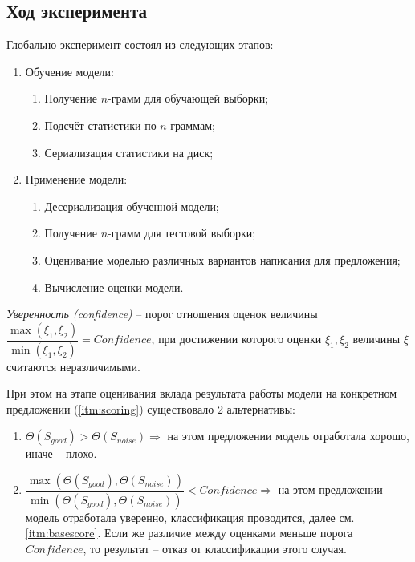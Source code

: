 \subsection{ Ход эксперимента }
\label{sec:confidencemodel}

Глобально эксперимент состоял из следующих этапов:

\begin{enumerate}
	\item Обучение модели:
	
	\begin{enumerate}
		\item Получение $n$-грамм для обучающей выборки;
		
		\item Подсчёт статистики по $n$-граммам;
		
		\item Сериализация статистики на диск;
	\end{enumerate}
	
	\item Применение модели:
	\begin{enumerate}
		\item Десериализация обученной модели;
		
		\item Получение $n$-грамм для тестовой выборки;
		
		\item Оценивание моделью различных вариантов написания для предложения;
		
		\item \label{itm:scoring} Вычисление оценки модели.
	\end{enumerate}	
\end{enumerate}

\begin{definition}
	{\textit{Уверенность (confidence)}} -- порог отношения оценок величины $\dfrac{\max(\xi_1, \xi_2)}{\min(\xi_1, \xi_2)} = Confidence$, при достижении которого оценки $\xi_1, \xi_2$ величины $\xi$ считаются неразличимыми.
\end{definition}

При этом на этапе оценивания вклада результата работы модели на конкретном предложении (\cref{itm:scoring}) существовало 2 альтернативы:

\begin{enumerate}
	\item \label{itm:basescore} $\Theta(S_{good}) > \Theta(S_{noise}) \Rightarrow $ на этом предложении модель отработала хорошо, иначе -- плохо.
	
	\item $\dfrac{\max(\Theta(S_{good}), \Theta(S_{noise}))}{\min(\Theta(S_{good}), \Theta(S_{noise}))} < Confidence \Rightarrow $ на этом предложении модель отработала уверенно, классификация проводится, далее см. \cref{itm:basescore}. Если же различие между оценками меньше порога $Confidence$, то результат -- отказ от классификации этого случая.
	
\end{enumerate}

